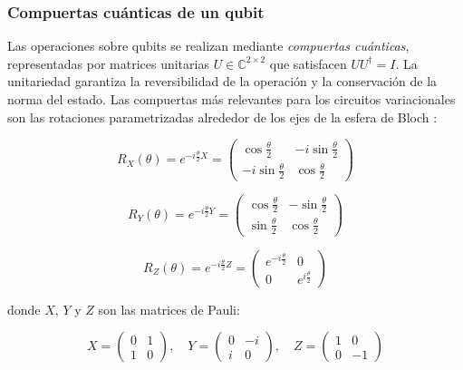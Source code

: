 
\subsubsection{Compuertas cuánticas de un qubit}

Las operaciones sobre qubits se realizan mediante \textit{compuertas cuánticas}, representadas por matrices unitarias $U \in \mathbb{C}^{2\times 2}$ que satisfacen $UU^\dagger = I$. La unitariedad garantiza la reversibilidad de la operación y la conservación de la norma del estado. Las compuertas más relevantes para los circuitos variacionales son las rotaciones parametrizadas alrededor de los ejes de la esfera de Bloch \cite{nielsen2010quantum}:

\begin{equation}
    R_X(\theta) = e^{-i\frac{\theta}{2}X} = 
    \begin{pmatrix} 
        \cos\frac{\theta}{2}  & -i\sin\frac{\theta}{2} \\ 
        -i\sin\frac{\theta}{2} & \cos\frac{\theta}{2} 
    \end{pmatrix}
    \label{eq:rx}
\end{equation}

\begin{equation}
    R_Y(\theta) = e^{-i\frac{\theta}{2}Y} = 
    \begin{pmatrix} 
        \cos\frac{\theta}{2}  & -\sin\frac{\theta}{2} \\ 
        \sin\frac{\theta}{2}  & \cos\frac{\theta}{2} 
    \end{pmatrix}
    \label{eq:ry}
\end{equation}

\begin{equation}
    R_Z(\theta) = e^{-i\frac{\theta}{2}Z} = 
    \begin{pmatrix} 
        e^{-i\frac{\theta}{2}} & 0 \\ 
        0 & e^{i\frac{\theta}{2}} 
    \end{pmatrix}
    \label{eq:rz}
\end{equation}

\noindent donde $X$, $Y$ y $Z$ son las matrices de Pauli:

\begin{equation}
    X = \begin{pmatrix} 0 & 1 \\ 1 & 0 \end{pmatrix}, \quad
    Y = \begin{pmatrix} 0 & -i \\ i & 0 \end{pmatrix}, \quad
    Z = \begin{pmatrix} 1 & 0 \\ 0 & -1 \end{pmatrix}
    \label{eq:pauli}
\end{equation}

